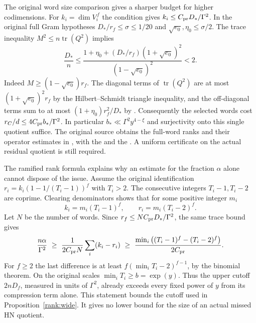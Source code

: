 The original word size comparison gives a sharper budget for higher
codimensions. For \(k_i=\dim V_i^{\,f}\) the condition
 gives \(k_i\le C_{\rm pr}D_*/\Gamma^2\).
In the original full Gram hypotheses
\(D_*/r_f\le\sigma\le1/20\) and
\(\sqrt{e_0},\eta_0\le\sigma/2\). The trace inequality
\(M^2\le n\operatorname{tr}(Q^2)\) implies
\[
 \frac{D_*}{n}\le
 \frac{1+\eta_0+(D_*/r_f)(1+\sqrt{e_0})^2}
      {(1-\sqrt{e_0})^2}<2 .
\]
Indeed \(M\ge(1-\sqrt{e_0})r_f\). The diagonal terms of
\(\operatorname{tr}(Q^2)\) are at most
\((1+\sqrt{e_0})^2r_f\) by the Hilbert--Schmidt triangle inequality,
and the off-diagonal terms sum to at most
\((1+\eta_0)r_f^2/D_*\) by . Consequently the
selected words cost \(r_C/d\le4C_{\rm pr}b_*/\Gamma^2\).
In particular \(b_*\ll\Gamma^2y^{4-\xi}\) and surjectivity onto
this single quotient suffice. The original source obtains the
full-word ranks and their operator estimates in
, with the
and the .
A uniform certificate on the actual
residual quotient is still required.

The ramified rank formula explains why an estimate for the fraction
\(\alpha\) alone cannot dispose of the issue. Assume the original
identification \(r_i=k_i(1-1/(T_i-1))^f\) with \(T_i>2\).
The consecutive integers \(T_i-1,T_i-2\) are coprime. Clearing
denominators shows that for some positive integer \(m_i\)
\[
        k_i=m_i(T_i-1)^f,\qquad r_i=m_i(T_i-2)^f.
\]
Let \(N\) be the number of words. Since
\(r_f\le NC_{\rm pr}D_*/\Gamma^2\), the same trace bound gives
\[
 \frac{n\alpha}{\Gamma^2}
 \ \ge\ \frac{1}{2C_{\rm pr}N}\sum_i(k_i-r_i)
 \ \ge\ \frac{\min_i\big((T_i-1)^f-(T_i-2)^f\big)}{2C_{\rm pr}} .
\]
For \(f\ge2\) the last difference is at least
\(f(\min_i T_i-2)^{f-1}\), by the binomial theorem.
On the original scales \(\min_i T_i\ge b=\exp(y)\). Thus the
upper cutoff \(2nD_f\), measured in units of \(\Gamma^2\), already
exceeds every fixed power of \(y\) from its compression term alone.
This statement bounds the cutoff used in Proposition~\ref{rank:wide}.
It gives no lower bound for the size of an actual missed HN quotient.

